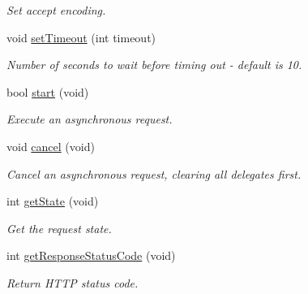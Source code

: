 \begin{DoxyCompactItemize}
\begin{DoxyCompactList}\small\item\em Set accept encoding. \end{DoxyCompactList}\item 
\mbox{\label{classHTTPRequest_aa05d522d24919e92edd0c7c49f9cef7d}} 
void \hyperlink{classHTTPRequest_aa05d522d24919e92edd0c7c49f9cef7d}{set\+Timeout} (int timeout)
\begin{DoxyCompactList}\small\item\em Number of seconds to wait before timing out -\/ default is 10. \end{DoxyCompactList}\item 
\mbox{\label{classHTTPRequest_abafb27559ed152937e4b0ff09f9b291a}} 
bool \hyperlink{classHTTPRequest_abafb27559ed152937e4b0ff09f9b291a}{start} (void)
\begin{DoxyCompactList}\small\item\em Execute an asynchronous request. \end{DoxyCompactList}\item 
\mbox{\label{classHTTPRequest_a2577169da3cd0d836cf25dc9e70b3c05}} 
void \hyperlink{classHTTPRequest_a2577169da3cd0d836cf25dc9e70b3c05}{cancel} (void)
\begin{DoxyCompactList}\small\item\em Cancel an asynchronous request, clearing all delegates first. \end{DoxyCompactList}\item 
\mbox{\label{classHTTPRequest_a8e4df0ab932f41614f282b868ece189a}} 
int \hyperlink{classHTTPRequest_a8e4df0ab932f41614f282b868ece189a}{get\+State} (void)
\begin{DoxyCompactList}\small\item\em Get the request state. \end{DoxyCompactList}\item 
\mbox{\label{classHTTPRequest_adf00190b63916546d8efa4bb7fb2cbdc}} 
int \hyperlink{classHTTPRequest_adf00190b63916546d8efa4bb7fb2cbdc}{get\+Response\+Status\+Code} (void)
\begin{DoxyCompactList}\small\item\em Return H\+T\+TP status code. \end{DoxyCompactList}\item 

\end{DoxyCompactItemize}
